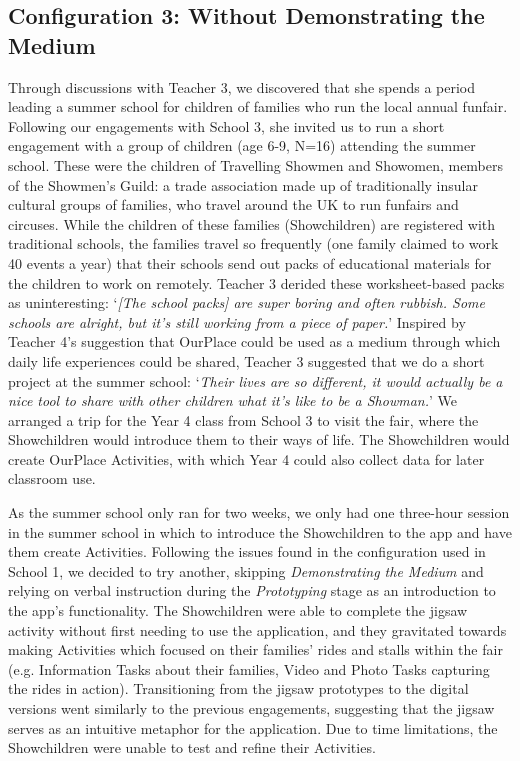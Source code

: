 \documentclass[,hyphens]{sigchi}
\begin{document}
\subsection{Configuration 3: Without Demonstrating the Medium}
Through discussions with Teacher 3, we discovered that she spends a period leading a summer school for children of families who run the local annual funfair. Following our engagements with School 3, she invited us to run a short engagement with a group of children (age 6-9, N=16) attending the summer school. These were the children of Travelling Showmen and Showomen, members of the Showmen's Guild: a trade association made up of traditionally insular cultural groups of families, who travel around the UK to run funfairs and circuses. While the children of these families (Showchildren) are registered with traditional schools, the families travel so frequently (one family claimed to work 40 events a year) that their schools send out packs of educational materials for the children to work on remotely. Teacher 3 derided these worksheet-based packs as uninteresting: `\textit{[The school packs] are super boring and often rubbish. Some schools are alright, but it's still working from a piece of paper.}' Inspired by Teacher 4's suggestion that OurPlace could be used as a medium through which daily life experiences could be shared, Teacher 3 suggested that we do a short project at the summer school: `\textit{Their lives are so different, it would actually be a nice tool to share with other children what it's like to be a Showman.}' We arranged a trip for the Year 4 class from School 3 to visit the fair, where the Showchildren would introduce them to their ways of life. The Showchildren would create OurPlace Activities, with which Year 4 could also collect data for later classroom use.

As the summer school only ran for two weeks, we only had one three-hour session in the summer school in which to introduce the Showchildren to the app and have them create Activities. Following the issues found in the configuration used in School 1, we decided to try another, skipping \textit{Demonstrating the Medium} and relying on verbal instruction during the \textit{Prototyping} stage as an introduction to the app's functionality. The Showchildren were able to complete the jigsaw activity without first needing to use the application, and they gravitated towards making Activities which focused on their families' rides and stalls within the fair (e.g. Information Tasks about their families, Video and Photo Tasks capturing the rides in action). Transitioning from the jigsaw prototypes to the digital versions went similarly to the previous engagements, suggesting that the jigsaw serves as an intuitive metaphor for the application. Due to time limitations, the Showchildren were unable to test and refine their Activities.
\end{document}
